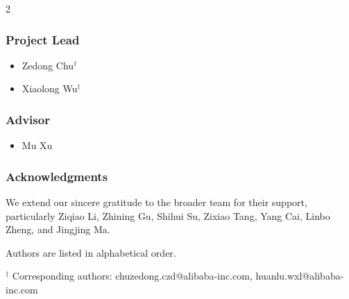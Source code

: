 \begin{multicols}{2}
\subsubsection*{Project Lead}
\begin{itemize}
\item Zedong Chu$^{\dagger}$
\item Xiaolong Wu$^{\dagger}$
\end{itemize}

\subsubsection*{Advisor}
\begin{itemize}
\item Mu Xu
\end{itemize}

\end{multicols}

\subsubsection*{Acknowledgments}
We extend our sincere gratitude to the broader team for their support, particularly Ziqiao Li, Zhining Gu, Shihui Su, Zixiao Tang, Yang Cai, Linbo Zheng, and Jingjing Ma.

\vfill
\noindent Authors are listed in alphabetical order.

\noindent $^{\dagger}$ Corresponding authors: chuzedong.czd@alibaba-inc.com, huanlu.wxl@alibaba-inc.com
